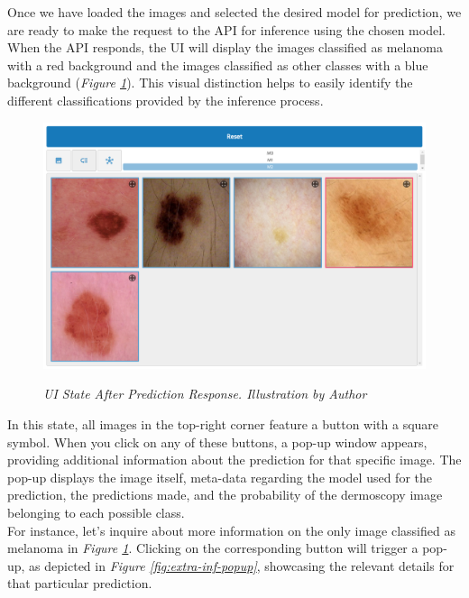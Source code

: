 Once we have loaded the images and selected the desired model for prediction,
we are ready to make the request to the API for inference using the chosen model. When the API responds,
the UI will display the images classified as melanoma with a
red background and the images classified as other classes with a blue background (\textit{Figure \ref{fig:after-prediction}}).
This visual distinction helps to easily identify the different classifications provided by the inference process.

\begin{figure}[H]
  \centering
  \begin{adjustbox}{width=\textwidth, trim={0cm 3.55cm 0cm 0cm}, clip}
    \includegraphics[width=\textwidth]{imatges/results/after-prediction.png}
  \end{adjustbox}
  \caption[UI State After Prediction Response]{\textit{UI State After Prediction Response. Illustration by Author}}
  {\label{fig:after-prediction}}
\end{figure}

In this state, all images in the top-right corner feature a button with a
square symbol. When you click on any of these buttons, a pop-up window appears,
providing additional information about the prediction for that specific image.
The pop-up displays the image itself, meta-data regarding the model used for
the prediction, the predictions made, and the probability of the dermoscopy
image belonging to each possible class. \\

For instance, let's inquire about more information on the only image classified
as melanoma in \textit{Figure \ref{fig:after-prediction}}. Clicking on the
corresponding button will trigger a pop-up, as depicted in \textit{Figure
\ref{fig:extra-inf-popup}}, showcasing the relevant details for that particular
prediction.

